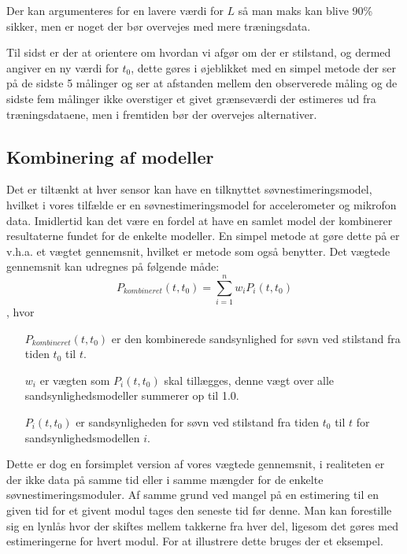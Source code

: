 Der kan argumenteres for en lavere værdi for $L$ så man maks kan blive 90\% sikker, men er noget der bør overvejes med mere træningsdata.

Til sidst er der at orientere om hvordan vi afgør om der er stilstand, og dermed angiver en ny værdi for $t_0$, dette gøres i øjeblikket med en simpel metode der ser på de sidste 5 målinger og ser at afstanden mellem den observerede måling og de sidste fem målinger ikke overstiger et givet grænseværdi der estimeres ud fra træningsdataene, men i fremtiden bør der overvejes alternativer.

\subsection{Kombinering af modeller}
Det er tiltænkt at hver sensor kan have en tilknyttet søvnestimeringsmodel, hvilket i vores tilfælde er en søvnestimeringsmodel for accelerometer og mikrofon data.
Imidlertid kan det være en fordel at have en samlet model der kombinerer resultaterne fundet for de enkelte modeller.
En simpel metode at gøre dette på er v.h.a. et vægtet gennemsnit, hvilket er metode som \citet{6563918} også benytter.
Det vægtede gennemsnit kan udregnes på følgende måde:
\begin{equation}
	P_{kombineret}(t,t_0) = \sum_{i=1}^{n}{w_iP_i(t,t_0)}
\end{equation}
, hvor
\begin{itemize}
	\item[$P_{kombineret}(t,t_0)$] er den kombinerede sandsynlighed for søvn ved stilstand fra tiden $t_0$ til $t$.
	\item[$w_i$] er vægten som $P_i(t,t_0)$ skal tillægges, denne vægt over alle sandsynlighedsmodeller summerer op til 1.0.
	\item[$P_i(t,t_0)$] er sandsynligheden for søvn ved stilstand fra tiden $t_0$ til $t$ for sandsynlighedsmodellen $i$.
\end{itemize}
Dette er dog en forsimplet version af vores vægtede gennemsnit, i realiteten er der ikke data på samme tid eller i samme mængder for de enkelte søvnestimeringsmoduler.
Af samme grund ved mangel på en estimering til en given tid for et givent modul tages den seneste tid før denne.
Man kan forestille sig en lynlås hvor der skiftes mellem takkerne fra hver del, ligesom det gøres med estimeringerne for hvert modul.
For at illustrere dette bruges der et eksempel.

